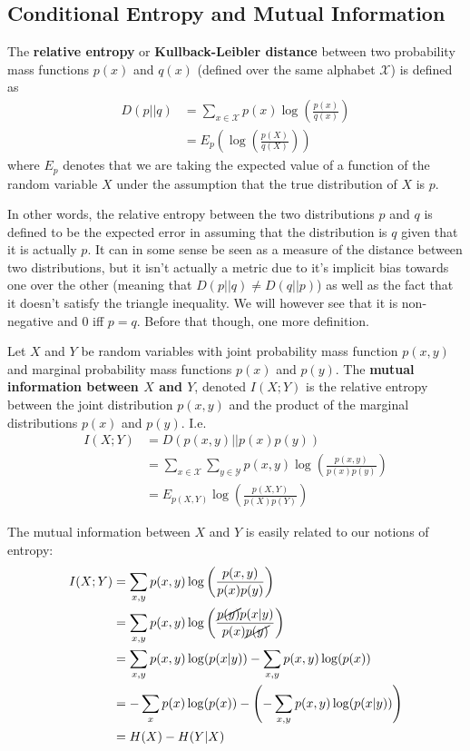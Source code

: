 \subsection{Conditional Entropy and Mutual Information}
\begin{definition}
	The \textbf{relative entropy} or \textbf{Kullback-Leibler distance} between two probability mass functions $p(x)$ and $q(x)$ (defined over the same alphabet $\mathcal{X}$) is defined as 
	\begin{align}
		D(p||q) &= \sum_{x \in \mathcal{X}} p(x) \log\left( \frac{p(x)}{q(x)} \right) \\
		&= E_p\left(\log\left(\frac{p(X)}{q(X)} \right)\right)
	\end{align}
where $E_p$ denotes that we are taking the expected value of a function of the random variable $X$ under the assumption that the true distribution of $X$ is $p$. 
\end{definition}
In other words, the relative entropy between the two distributions $p$ and $q$ is defined to be the expected error in assuming that the distribution is $q$ given that it is actually $p$. It can in some sense be seen as a measure of the distance between two distributions, but it isn't actually a metric due to it's implicit bias towards one over the other (meaning that $D(p||q) \neq D(q||p)$) as well as the fact that it doesn't satisfy the triangle inequality. We will however see that it is non-negative and $0$ iff $p = q$. Before that though, one more definition.
\begin{definition}
	Let $X$ and $Y$ be random variables with joint probability mass function $p(x,y)$ and marginal probability mass functions $p(x)$ and $p(y)$. The \textbf{mutual information between $X$ and $Y$}, denoted $I(X;Y)$ is the relative entropy between the joint distribution $p(x,y)$ and the product of the marginal distributions $p(x)$ and $p(y)$. I.e. 
	\begin{align}
		I(X;Y) &= D(p(x,y)||p(x)p(y)) \\
			&= \sum_{x \in \mathcal{X}}\sum_{y \in \mathcal{Y}} p(x,y)\log\left( \frac{p(x,y)}{p(x)p(y)} \right) \\
			&= E_{p(X,Y)}\log\left( \frac{p(X,Y)}{p(X)p(Y)} \right) 
	\end{align}
\end{definition}
The mutual information between $X$ and $Y$ is easily related to our notions of entropy:
\begin{align}
	I(X;Y) &= \sum_{x,y} p(x,y) \log\left( \frac{p(x,y)}{p(x)p(y)}\right) \\
		   &= \sum_{x,y} p(x,y) \log\left( \frac{ \cancel{p(y)} p(x|y)}{p(x)\cancel{p(y)}} \right) \\
		   &=  \sum_{x,y}p(x,y)\log(p(x|y)) - \sum_{x,y} p(x,y)\log(p(x)) \\
		   &= - \sum_x p(x)\log(p(x)) - \left( - \sum_{x,y}p(x,y)\log(p(x|y)) \right) \\
		   &= H(X) - H(Y|X)
\end{align}
